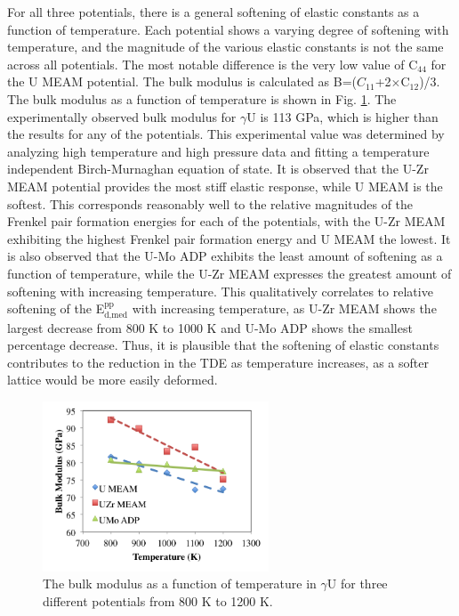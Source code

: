 \documentclass[review]{elsarticle}
\begin{document}
\FloatBarrier

For all three potentials, there is a general softening of elastic constants as a function of temperature. Each potential shows a varying degree of softening with temperature, and the magnitude of the various elastic constants is not the same across all potentials. The most notable difference is the very low value of C$_{44}$ for the U MEAM potential. The bulk modulus is calculated as B=($C_{11}$+2$\times$C$_{12}$)/3. The bulk modulus as a function of temperature is shown in Fig. \ref{fig:bulk}. The experimentally observed bulk modulus for $\gamma$U is 113 GPa\cite{yoo1998}, which is higher than the results for any of the potentials. This experimental value was determined by analyzing high temperature and high pressure data and fitting a temperature independent Birch-Murnaghan equation of state. It is observed that the U-Zr MEAM potential provides the most stiff elastic response, while U MEAM is the softest. This corresponds reasonably well to the relative magnitudes of the Frenkel pair formation energies for each of the potentials, with the U-Zr MEAM exhibiting the highest Frenkel pair formation energy and U MEAM the lowest. It is also observed that the U-Mo ADP exhibits the least amount of softening as a function of temperature, while the U-Zr MEAM expresses the greatest amount of softening with increasing temperature. This qualitatively correlates to relative softening of the E$^{\textrm{pp}}_{\textrm{d,med}}$ with increasing temperature, as U-Zr MEAM shows the largest decrease from 800 K to 1000 K and U-Mo ADP shows the smallest percentage decrease. Thus, it is plausible that the softening of elastic constants contributes to the reduction in the TDE as temperature increases, as a softer lattice would be more easily deformed. 

\begin{figure}[h]
 \centering
 \includegraphics[width=0.6\textwidth]{bulk_vs_Tb.png} 
 \caption{The bulk modulus as a function of temperature in $\gamma$U for three different potentials from 800 K to 1200 K.}
 \label{fig:bulk}
\end{figure}
\end{document}
